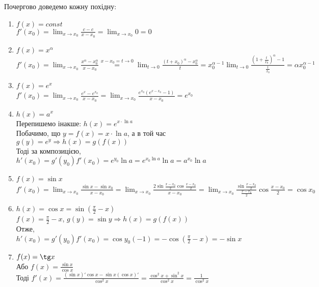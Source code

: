 \documentclass[a4paper, 14pt]{article}
\theoremstyle{theoremdd}
\theoremstyle{theoremdd}
\theoremstyle{theoremdd}
\theoremstyle{theoremdd}
\theoremstyle{theoremdd}
\theoremstyle{theoremdd}
\theoremstyle{theoremdd}
\theoremstyle{theoremdd}
\begin{document}
Почергово доведемо кожну похідну:
\begin{enumerate}[wide=0pt,label={\arabic*)}]
\item $f(x) = const$\\
$f'(x_0) = \displaystyle \lim_{x \to x_0} \frac{c-c}{x-x_0} = \lim_{x \to x_0} 0 = 0$

\item  $f(x) = x^{\alpha}$\\
$f'(x_0) = \displaystyle \lim_{x \to x_0} \frac{x^{\alpha} - x_0^{\alpha}}{x-x_0} \overset{x-x_0 = t \to 0}{=} \lim_{t \to 0} \frac{(t+x_0)^{\alpha} - x_0^{\alpha}}{t} = x_0^{\alpha-1} \lim_{t \to 0} \frac{\left(1 + \frac{t}{x_0}\right)^{\alpha} - 1}{\frac{t}{x_0}} = \alpha x_0^{\alpha-1}$

\item  $f(x) = e^x$\\
$f'(x_0) = \displaystyle \lim_{x \to x_0} \frac{e^x-e^{x_0}}{x-x_0} = \lim_{x \to x_0} \frac{e^{x_0}(e^{x-x_0}-1)}{x-x_0} = e^{x_0}$

\item $h(x) = a^x$\\
Перепишемо інакше: $h(x) = e^{x \cdot \ln a}$\\
Побачимо, що $y = f(x) = x \cdot \ln a$, а в той час $g(y) = e^y \Rightarrow h(x)=g(f(x))$\\
Тоді за композицією, $h'(x_0) = g'(y_0) f'(x_0) = e^{y_0} \ln a = e^{x_0 \ln a} \ln a = a^{x_0} \ln a$

\item $f(x) = \sin x$\\
$f'(x_0) = \displaystyle \lim_{x \to x_0} \frac{\sin x - \sin x_0}{x-x_0} = \lim_{x \to x_0} \frac{2 \sin \frac{x-x_0}{2} \cos \frac{x-x_0}{2}}{x-x_0} = \lim_{x \to x_0} \frac{\sin \frac{x-x_0}{2}}{\frac{x-x_0}{2}} \cos \frac{x-x_0}{2} = \cos x_0$

\item $h(x) = \displaystyle \cos x = \sin \left(\frac{\pi}{2} - x \right)$\\
$f(x) = \displaystyle \frac{\pi}{2} - x$, $g(y) = \sin y \Rightarrow h(x) = g(f(x))$\\
Отже, $h'(x_0) = g'(y_0)f'(x_0) = \cos y_0 (-1) = \displaystyle -\cos \left(\frac{\pi}{2} - x \right) = -\sin x$

\item $f(x) = \tg x$\\
Або $f(x) = \displaystyle \frac{\sin x}{\cos x}$\\
Тоді $f'(x) = \displaystyle \frac{(\sin x)' \cos x - \sin x (\cos x)'}{\cos^2 x} = \frac{\cos^2 x + \sin^2x}{\cos^2 x} = \frac{1}{\cos^2 x}$


\end{enumerate}
\end{document}
